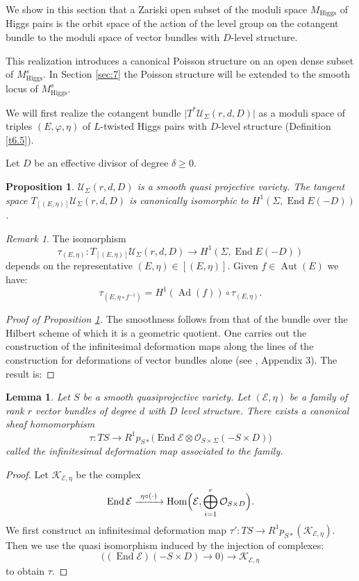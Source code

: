 \documentclass[12pt,a4paper,oneside,english]{smfart}
\newtheorem{prop}[thm]{Proposition}
\newtheorem{lem}[thm]{Lemma}
\theoremstyle{definition}
\theoremstyle{remark}
\newtheorem{rem}[thm]{Remark}
\DeclareMathOperator{\End}{End}
\DeclareMathOperator{\Hom}{Hom}
\DeclareMathOperator{\Aut}{Aut}
\DeclareMathOperator{\Ad}{Ad}
\newcommand{\Hig}{\mathrm{Higgs}}
\newcommand{\MH}{M_{\Hig}}
\newcommand{\MHs}{M^{s}_{\Hig}}
\newcommand{\cU}{\mathcal{U}}
\newcommand{\cO}{\mathcal{O}}
\newcommand{\cE}{\mathcal{E}}
\newcommand{\KK}{\mathscr{K}}
\newcommand{\tot}[1]{\lvert #1 \rvert}
\begin{document}
We show in this section that a Zariski open subset of the moduli space $\MH$ of Higgs pairs is the orbit space of the action of the level group on the cotangent bundle to the moduli space of vector bundles with $D$-level structure.

This realization introduces a canonical Poisson structure on an open dense subset of $\MHs$. In Section \ref{sec:7} the Poisson structure will be extended to the smooth locus of $\MHs$.

We will first realize the cotangent bundle $\tot{T^*\cU_\Sigma(r, d, D)}$ as a moduli space of triples $(E, \varphi, \eta)$ of $L$-twisted Higgs pairs with $D$-level structure (Definition \ref{t6.5}).

Let $D$ be an effective divisor of degree $\delta \geqslant 0$.

\begin{prop}\label{t6.1}
$\cU_\Sigma(r, d, D)$ is a smooth quasi projective variety. The tangent space $T_{[(E,\eta)]}\cU_\Sigma(r, d, D)$ is canonically isomorphic to $H^1(\Sigma, \End E(-D))$.
\end{prop}

\begin{rem}\label{t6.2}
The isomorphism
\[
\tau_{(E, \eta)} \colon T_{[(E, \eta)]}\cU_\Sigma(r, d, D) \to H^1(\Sigma, \End E(-D))
\]
depends on the representative $(E, \eta) \in [(E, \eta)]$. Given $f \in \Aut(E)$ we have:
\[
\tau_{(E, \eta \circ f^{-1})} = H^1(\Ad(f)) \circ \tau_{(E, \eta)}.
\]
\end{rem}

\begin{proof}[Proof of Proposition \ref{t6.1}]
The smoothness follows from that of the bundle over the Hilbert scheme of which it is a geometric quotient. One carries out the construction of the infinitesimal deformation maps along the lines of the construction for deformations of vector bundles alone (see \cite{Se}, Appendix 3). The result is:
\end{proof}

\begin{lem}\label{t6.3}
Let $S$ be a smooth quasiprojective variety. Let $(\cE, \eta)$ be a family of rank $r$ vector bundles of degree $d$ with $D$ level structure. There exists a canonical sheaf homomorphism
\[
\tau \colon TS \to R^1 p_{S*}\bigl(\End \cE \otimes \cO_{S \times \Sigma}(-S \times D)\bigr)
\]
called the infinitesimal deformation map associated to the family.
\end{lem}

\begin{proof}
Let $\KK_{\cE, \eta}$ be the complex
\[
\End \cE \xrightarrow{\ \eta \circ (\cdot)\ } \Hom\Bigl(\cE, \bigoplus_{i=1}^{r} \cO_{S \times D}\Bigr).
\]
We first construct an infinitesimal deformation map $\tau' \colon TS \to R^1 p_{S*}(\KK_{\cE, \eta})$. Then we use the quasi isomorphism induced by the injection of complexes:
\[
\bigl((\End \cE)(-S \times D) \to 0\bigr) \to \KK_{\cE, \eta}
\]
to obtain $\tau$.
\end{proof}
\end{document}
